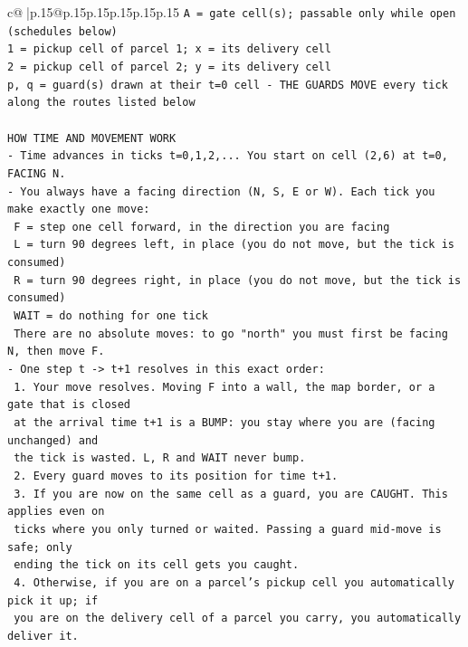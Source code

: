 \documentclass{article}
\begin{document}
{\begin{supertabular}{c@{$\;$}|p{.15\linewidth}@{}p{.15\linewidth}p{.15\linewidth}p{.15\linewidth}p{.15\linewidth}p{.15\linewidth}}
{{{\texttt{A = gate cell(s); passable only while open (schedules below)} \\
\texttt{1 = pickup cell of parcel 1; x = its delivery cell} \\
\texttt{2 = pickup cell of parcel 2; y = its delivery cell} \\
\texttt{p, q = guard(s) drawn at their t=0 cell {-} THE GUARDS MOVE every tick along the routes listed below} \\
\\ 
\texttt{HOW TIME AND MOVEMENT WORK} \\
\texttt{{-} Time advances in ticks t=0,1,2,... You start on cell (2,6) at t=0, FACING N.} \\
\texttt{{-} You always have a facing direction (N, S, E or W). Each tick you make exactly one move:} \\
\texttt{  F    = step one cell forward, in the direction you are facing} \\
\texttt{  L    = turn 90 degrees left, in place (you do not move, but the tick is consumed)} \\
\texttt{  R    = turn 90 degrees right, in place (you do not move, but the tick is consumed)} \\
\texttt{  WAIT = do nothing for one tick} \\
\texttt{  There are no absolute moves: to go "north" you must first be facing N, then move F.} \\
\texttt{{-} One step t {-}> t+1 resolves in this exact order:} \\
\texttt{  1. Your move resolves. Moving F into a wall, the map border, or a gate that is closed} \\
\texttt{     at the arrival time t+1 is a BUMP: you stay where you are (facing unchanged) and} \\
\texttt{     the tick is wasted. L, R and WAIT never bump.} \\
\texttt{  2. Every guard moves to its position for time t+1.} \\
\texttt{  3. If you are now on the same cell as a guard, you are CAUGHT. This applies even on} \\
\texttt{     ticks where you only turned or waited. Passing a guard mid{-}move is safe; only} \\
\texttt{     ending the tick on its cell gets you caught.} \\
\texttt{  4. Otherwise, if you are on a parcel's pickup cell you automatically pick it up; if} \\
\texttt{     you are on the delivery cell of a parcel you carry, you automatically deliver it.} \\
}}}
\end{supertabular}}
\end{document}
